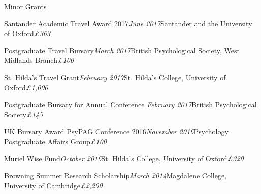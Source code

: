 \documentclass{resume} %
\begin{document}
\begin{rSection}{Minor Grants}
\begin{rSubsection}{Santander Academic Travel Award 2017}{\em June 2017}{Santander and the University of Oxford}{\hfill {\em \pounds 363}}
\item[]\vspace{-1.5\baselineskip}
\end{rSubsection}

\begin{rSubsection}{Postgraduate Travel Bursary}{\em March 2017}{British Psychological Society, West Midlands Branch}{\hfill {\em \pounds 100}}
\item[]\vspace{-1.5\baselineskip}
\end{rSubsection}

\begin{rSubsection}{St. Hilda’s Travel Grant}{\em February 2017}{St. Hilda’s College, University of Oxford}{\hfill {\em \pounds 1,000}}
\item[]\vspace{-1.5\baselineskip}
\end{rSubsection}

\begin{rSubsection}{Postgraduate Bursary for Annual Conference }{\em February 2017}{British Psychological Society}{\hfill {\em \pounds 145}}
\item[]\vspace{-1.5\baselineskip}
\end{rSubsection}

\begin{rSubsection}{UK Bursary Award PsyPAG Conference 2016}{\em November 2016}{Psychology Postgraduate Affairs Group}{\hfill {\em \pounds 100}}
\item[]\vspace{-1.5\baselineskip}
\end{rSubsection}

\begin{rSubsection}{Muriel Wise Fund}{\em October 2016}{St. Hilda’s College, University of Oxford}{\hfill {\em \pounds 320}}
\item[]\vspace{-1.5\baselineskip}
\end{rSubsection}

\begin{rSubsection}{Browning Summer Research Scholarship}{\em March 2014}{Magdalene College, University of Cambridge}{\hfill {\em \pounds 2,200}}
\item[]\vspace{-1.5\baselineskip}
\end{rSubsection}


\end{rSection}
\end{document}
